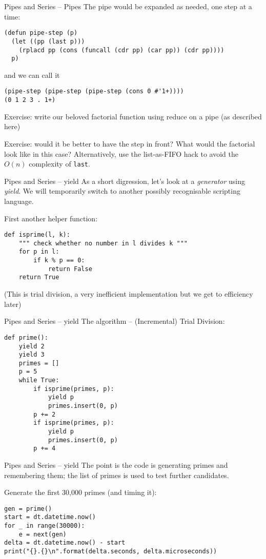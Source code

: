 \documentclass[presentation]{beamer}
\begin{document}
\begin{frame}[fragile]{Pipes and Series -- Pipes}
  The pipe would be expanded as needed, one step at a time:
\begin{verbatim}
(defun pipe-step (p)
  (let ((pp (last p)))
    (rplacd pp (cons (funcall (cdr pp) (car pp)) (cdr pp))))
  p)
\end{verbatim}
and we can call it
\begin{verbatim}
(pipe-step (pipe-step (pipe-step (cons 0 #'1+))))
(0 1 2 3 . 1+)
\end{verbatim}
Exercise: write our beloved factorial function using reduce on a pipe (as described here)

\medskip
Exercise: would it be better to have the step in front?  What would the factorial look like in this case?  Alternatively, use the list-as-FIFO hack to avoid  the $O(n)$ complexity of \texttt{last}.
\end{frame}

\begin{frame}[fragile]{Pipes and Series -- yield}
  As a short digression, let's look at a \emph{generator} using \emph{yield}.  We will temporarily switch to another possibly recognisable scripting language.

  \medskip
  First another helper function:
\begin{verbatim}
def isprime(l, k):
    """ check whether no number in l divides k """
    for p in l:
        if k % p == 0:
            return False
    return True
\end{verbatim}

\medskip (This is trial division, a very inefficient implementation but we get to efficiency later)
\end{frame}

\begin{frame}[fragile]{Pipes and Series -- yield}
The algorithm -- (Incremental) Trial Division:
\begin{verbatim}
def prime():
    yield 2
    yield 3
    primes = []
    p = 5
    while True:
        if isprime(primes, p):
            yield p
            primes.insert(0, p)
        p += 2
        if isprime(primes, p):
            yield p
            primes.insert(0, p)
        p += 4
\end{verbatim}
\end{frame}

\begin{frame}[fragile]{Pipes and Series -- yield}
  The point is the code is generating primes and remembering them; the list of primes is used to test further candidates.

  \medskip
Generate the first 30,000 primes (and timing it):
\begin{verbatim}
gen = prime()
start = dt.datetime.now()
for _ in range(30000):
    e = next(gen)
delta = dt.datetime.now() - start
print("{}.{}\n".format(delta.seconds, delta.microseconds))
\end{verbatim}
\end{frame}
\end{document}
